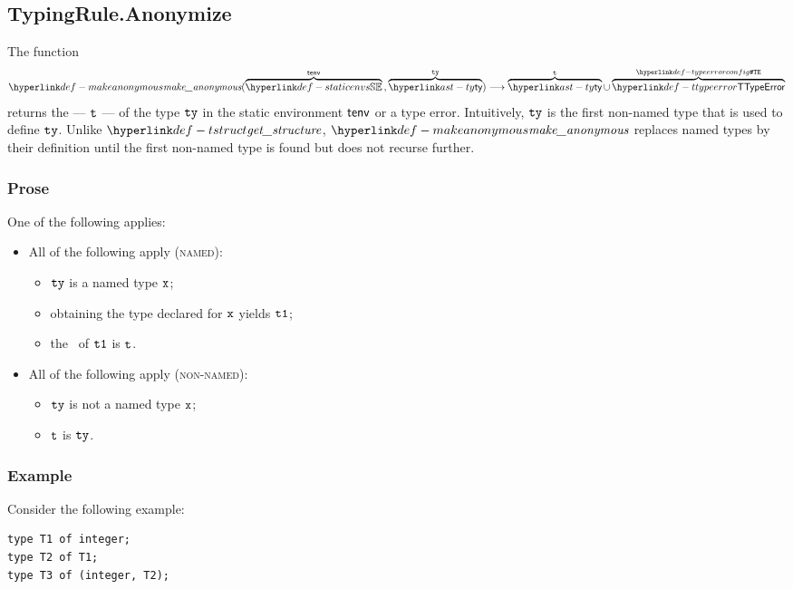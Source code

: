 
\subsection{TypingRule.Anonymize \label{sec:anonymize}}
\hypertarget{def-makeanonymous}{}
\hypertarget{def-underlyingtype}{}
The function
\[
  \makeanonymous(\overname{\staticenvs}{\tenv} \aslsep \overname{\ty}{\tty}) \aslto \overname{\ty}{\vt} \cup \overname{\TTypeError}{\TypeErrorConfig}
\]
returns the \emph{\underlyingtype} --- $\texttt{t}$ --- of the type $\texttt{ty}$ in the static environment $\textsf{tenv}$ or a type error.
Intuitively, $\texttt{ty}$ is the first non-named type that is used to define $\texttt{ty}$. Unlike $\tstruct$,
$\makeanonymous$ replaces named types by their definition until the first non-named type is found but
does not recurse further.

\subsubsection{Prose}
One of the following applies:
\begin{itemize}
  \item All of the following apply (\textsc{named}):
  \begin{itemize}
    \item $\texttt{ty}$ is a named type $\texttt{x}$;
    \item obtaining the type declared for $\texttt{x}$ yields $\texttt{t1}$\ProseOrTypeError;
    \item the \underlyingtype\ of $\texttt{t1}$ is $\texttt{t}$.
  \end{itemize}

  \item All of the following apply (\textsc{non-named}):
  \begin{itemize}
    \item $\texttt{ty}$ is not a named type $\texttt{x}$;
    \item $\texttt{t}$ is $\texttt{ty}$.
  \end{itemize}
\end{itemize}

\subsubsection{Example}
Consider the following example:
\begin{verbatim}
type T1 of integer;
type T2 of T1;
type T3 of (integer, T2);
\end{verbatim}

